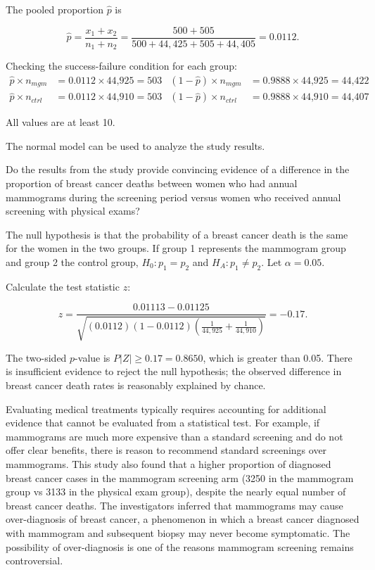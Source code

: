 \begin{example}
The pooled proportion $\hat{p}$ is  

\[\hat{p} = \dfrac{x_{1} + x_{2}}{n_{1} + n_{2}} = \dfrac{500 + 505}{500 + 44,425 + 505 + 44,405} = 0.0112. \]

Checking the success-failure condition for each group: 
\begin{align*}
\hat{p} \times n_{mgm} &= 0.0112 \times \text{44,925} = 503
& (1 - \hat{p}) \times n_{mgm} &= 0.9888 \times \text{44,925} = \text{44,422} \\
\hat{p} \times n_{ctrl} &= 0.0112 \times \text{44,910} = 503
& (1 - \hat{p}) \times n_{ctrl} &= 0.9888 \times \text{44,910} = \text{44,407}
\end{align*}

All values are at least 10. 

The normal model can be used to analyze the study results.
\label{mammogramSuccessFailure}
\end{example}

\begin{example}{Do the results from the study provide convincing evidence of a difference in the proportion of breast cancer deaths between women who had annual mammograms during the screening period versus women who received annual screening with physical exams?}

\label{mammogramExProp}

The null hypothesis is that the probability of a breast cancer death is the same for the women in the two groups. If group 1 represents the mammogram group and group 2 the control group, $H_0: p_1 = p_2$ and $H_A: p_1 \neq p_2$.  Let $\alpha = 0.05$.

Calculate the test statistic $z$:

\[z = \dfrac{0.01113 - 0.01125}{\sqrt{(0.0112)(1-0.0112)\left(\frac{1}{44,925} + \frac{1}{44,910} \right)}} = -0.17.
\]	
	
The two-sided $p$-value is $P|Z| \ge 0.17 = 0.8650$,  which is greater than 0.05. There is insufficient evidence to reject the null hypothesis; the observed difference in breast cancer death rates is reasonably explained by chance. 	


Evaluating medical treatments typically requires accounting for additional evidence that cannot be evaluated from a statistical test. For example, if mammograms are much more expensive than a standard screening and do not offer clear benefits, there is reason to recommend standard screenings over mammograms. This study also found that a higher proportion of diagnosed breast cancer cases in the mammogram screening arm (3250 in the mammogram group vs 3133 in the physical exam group), despite the nearly equal number of breast cancer deaths.  The investigators inferred that mammograms may cause over-diagnosis of breast cancer, a phenomenon in which a breast cancer diagnosed with mammogram and subsequent biopsy may never become symptomatic. The possibility of over-diagnosis is one of the reasons mammogram screening remains controversial.

\end{example}

